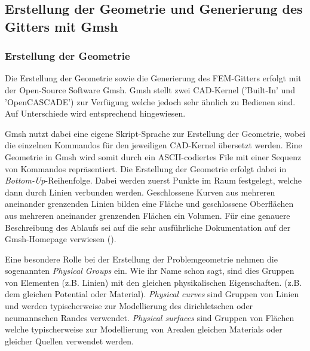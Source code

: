 \subsection{Erstellung der Geometrie und Generierung des Gitters mit Gmsh}
\subsubsection{Erstellung der Geometrie}
Die Erstellung der Geometrie sowie die Generierung des FEM-Gitters erfolgt mit der Open-Source Software Gmsh. \cite{gmsh_website}
Gmsh stellt zwei CAD-Kernel ('Built-In' und 'OpenCASCADE') zur Verfügung welche jedoch sehr ähnlich zu Bedienen sind. Auf Unterschiede wird entsprechend hingewiesen.\newline

Gmsh nutzt dabei eine eigene Skript-Sprache zur Erstellung der Geometrie, wobei die einzelnen Kommandos für den jeweiligen CAD-Kernel übersetzt werden. Eine Geometrie in Gmsh wird somit durch ein ASCII-codiertes File mit einer Sequenz von Kommandos repräsentiert. Die Erstellung der Geometrie erfolgt dabei in \textit{Bottom-Up}-Reihenfolge. Dabei werden zuerst Punkte im Raum festgelegt, welche dann durch Linien verbunden werden. Geschlossene Kurven aus mehreren aneinander grenzenden Linien bilden eine Fläche und geschlossene Oberflächen aus mehreren aneinander grenzenden Flächen ein Volumen. Für eine genauere Beschreibung des Ablaufs sei auf die sehr ausführliche Dokumentation auf der Gmsh-Homepage verwiesen (\cite{gmsh_website}).\newline

Eine besondere Rolle bei der Erstellung der Problemgeometrie nehmen die sogenannten \textit{Physical Groups} ein. Wie ihr Name schon sagt, sind dies Gruppen von Elementen (z.B. Linien) mit den gleichen physikalischen Eigenschaften. (z.B. dem gleichen Potential oder Material). \textit{Physical curves} sind Gruppen von Linien und werden typischerweise zur Modellierung des dirichletschen oder neumannschen Randes verwendet. \textit{Physical surfaces} sind Gruppen von Flächen welche typischerweise zur Modellierung von Arealen gleichen Materials oder gleicher Quellen verwendet werden.
 
